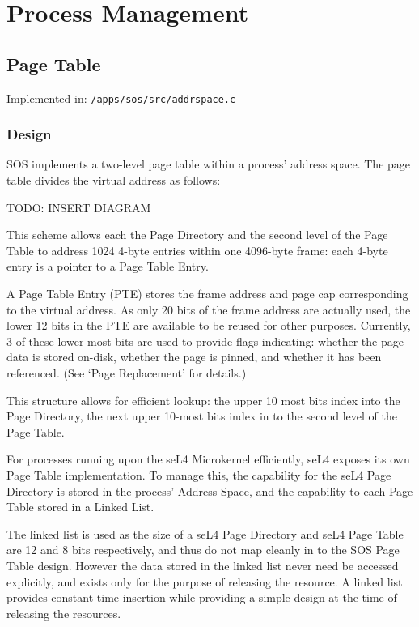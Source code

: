 \documentclass[a4paper,12pt]{article}
\begin{document}
\section{Process Management}
\subsection{Page Table}
Implemented in: \texttt{/apps/sos/src/addrspace.c}

\subsubsection{Design}
SOS implements a two-level page table within a process' address space.  The
page table divides the virtual address as follows:

TODO: INSERT DIAGRAM

This scheme allows each the Page Directory and the second level of the Page
Table to address 1024 4-byte entries within one 4096-byte frame: each 4-byte
entry is a pointer to a Page Table Entry.

A Page Table Entry (PTE) stores the frame address and page cap corresponding
to the virtual address.  As only 20 bits of the frame address are actually
used, the lower 12 bits in the PTE are available to be reused for other
purposes.  Currently, 3 of these lower-most bits are used to provide flags
indicating: whether the page data is stored on-disk, whether the page is
pinned, and whether it has been referenced.  (See `Page Replacement' for
details.)

This structure allows for efficient lookup: the upper 10 most bits index into
the Page Directory, the next upper 10-most bits index in to the second level
of the Page Table.

For processes running upon the seL4 Microkernel efficiently, seL4 exposes its
own Page Table implementation.  To manage this, the capability for the seL4
Page Directory is stored in the process' Address Space, and the capability to
each Page Table stored in a Linked List.

The linked list is used as the size of a seL4 Page Directory and seL4 Page
Table are 12 and 8 bits respectively, and thus do not map cleanly in to the
SOS Page Table design.  However the data stored in the linked list never need
be accessed explicitly, and exists only for the purpose of releasing the
resource.  A linked list provides constant-time insertion while providing a
simple design at the time of releasing the resources.
\end{document}
